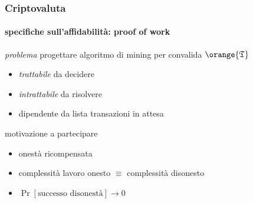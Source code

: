 \begin{frame}

	\frametitle{Criptovaluta}
	\framesubtitle{specifiche sull'affidabilità: \textbf{proof of work}}
	
	\textit{problema} \vspace{5pt}
	\newline progettare algoritmo di {\color{blue}mining} per convalida $\orange{\mathfrak{T}}$
	\begin{itemize}
	  \item \textit{trattabile} da decidere
	  \item \textit{intrattabile} da risolvere
	  \item dipendente da lista transazioni in attesa
	\end{itemize}
	motivazione a {\color{blue}partecipare}
	\begin{itemize}
		\item onestà ricompensata
	  	\item complessità lavoro onesto $\equiv$ complessità disonesto 
	  	\item $\Pr[\text{successo disonestà}]\rightarrow 0$
	\end{itemize}
	
\end{frame}

	